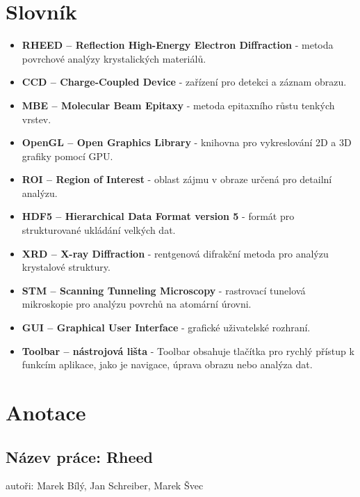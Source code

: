 \documentclass{article}
\begin{document}
\newpage

\tableofcontents

\newpage

\section{Slovník}
\begin{itemize}
\item \textbf{RHEED – Reflection High-Energy Electron Diffraction} - metoda povrchové analýzy krystalických materiálů.\\
\item \textbf{CCD – Charge-Coupled Device} - zařízení pro detekci a záznam obrazu.\\
\item \textbf{MBE – Molecular Beam Epitaxy} - metoda epitaxního růstu tenkých vrstev.\\
\item \textbf{OpenGL – Open Graphics Library} - knihovna pro vykreslování 2D a 3D grafiky pomocí GPU.\\
\item \textbf{ROI – Region of Interest} - oblast zájmu v obraze určená pro detailní analýzu.\\
\item \textbf{HDF5 – Hierarchical Data Format version 5} - formát pro strukturované ukládání velkých dat.\\
\item \textbf{XRD – X-ray Diffraction} - rentgenová difrakční metoda pro analýzu krystalové struktury.\\
\item \textbf{STM – Scanning Tunneling Microscopy} - rastrovací tunelová mikroskopie pro analýzu povrchů na atomární úrovni.\\
\item \textbf{GUI – Graphical User Interface} - grafické uživatelské rozhraní.\\
\item \textbf{Toolbar – nástrojová lišta} - Toolbar obsahuje tlačítka pro rychlý přístup k funkcím aplikace, jako je navigace, úprava obrazu nebo analýza dat.
\end{itemize}
\newpage

\section*{Anotace}

\subsection*{Název práce: Rheed}
autoři: Marek Bílý, Jan Schreiber, Marek Švec
\vspace{0.5cm}
\end{document}
